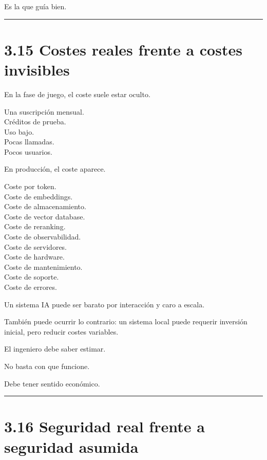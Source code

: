 Es la que guía bien.

\begin{center}\rule{0.5\linewidth}{0.5pt}\end{center}

\section{3.15 Costes reales frente a costes
invisibles}\label{costes-reales-frente-a-costes-invisibles}

En la fase de juego, el coste suele estar oculto.

Una suscripción mensual.\\
Créditos de prueba.\\
Uso bajo.\\
Pocas llamadas.\\
Pocos usuarios.

En producción, el coste aparece.

Coste por token.\\
Coste de embeddings.\\
Coste de almacenamiento.\\
Coste de vector database.\\
Coste de reranking.\\
Coste de observabilidad.\\
Coste de servidores.\\
Coste de hardware.\\
Coste de mantenimiento.\\
Coste de soporte.\\
Coste de errores.

Un sistema IA puede ser barato por interacción y caro a escala.

También puede ocurrir lo contrario: un sistema local puede requerir
inversión inicial, pero reducir costes variables.

El ingeniero debe saber estimar.

No basta con que funcione.

Debe tener sentido económico.

\begin{center}\rule{0.5\linewidth}{0.5pt}\end{center}

\section{3.16 Seguridad real frente a seguridad
asumida}\label{seguridad-real-frente-a-seguridad-asumida}

